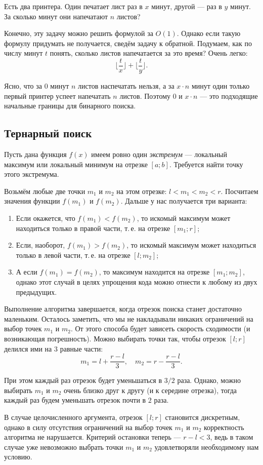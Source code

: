 \begin{problem}
    Есть два принтера. Один печатает лист раз в $x$ минут, другой --- раз в $y$ минут. За сколько минут они напечатают $n$ листов?
\end{problem}

Конечно, эту задачу можно решить формулой за $O(1)$. Однако если такую формулу придумать не получается, сведём задачу к обратной. Подумаем, как по числу минут $t$ понять, сколько листов напечатается за это время? Очень легко:
\[
    \lfloor\frac{t}{x}\rfloor + \lfloor\frac{t}{y}\rfloor.
\]

Ясно, что за $0$ минут $n$ листов наспечатать нельзя, а за $x \cdot n$ минут один только первый принтер успеет напечатать $n$ листов. Поэтому $0$ и $x \cdot n$ --- это подходящие начальные границы для бинарного поиска.

\subsection{Тернарный поиск}

Пусть дана функция $f(x)$ имеем ровно один \textit{экстремум} --- локальный максимум или локальный минимум на отрезке $[a; b]$. Требуется найти точку этого экстремума.

Возьмём любые две точки $m_1$ и $m_2$ на этом отрезке: $l < m_1 < m_2 < r$. Посчитаем значения функции $f(m_1)$ и $f(m_2)$. Дальше у нас получается три варианта:

\begin{enumerate}[nolistsep]
    \item Если окажется, что $f(m_1) < f(m_2)$, то искомый максимум может находиться только в правой части, т.\,е. на отрезке $[m_1; r]$;
    \item Если, наоборот, $f(m_1) > f(m_2)$, то искомый максимум может находиться только в левой части, т.\,е. на отрезке $[l; m_2]$;
    \item А если $f(m_1) = f(m_2)$, то максимум находится на отрезке $[m_1; m_2]$, однако этот случай в целях упрощения кода можно отнести к любому из двух предыдущих.
\end{enumerate}

Выполнение алгоритма завершается, когда отрезок поиска станет достаточно маленьким. Осталось заметить, что мы не накладывали никаких ограничений на выбор точек $m_1$ и $m_2$. От этого способа будет зависеть скорость сходимости (и возникающая погрешность). Можно выбирать точки так, чтобы отрезок $[l; r]$ делился ими на $3$ равные части:
\[
    m_1 = l + \frac{r - l}{3},\quad m_2 = r - \frac{r - l}{3}.
\]

При этом каждый раз отрезок будет уменьшаться в $3 / 2$ раза. Однако, можно выбирать $m_1$ и $m_2$ очень близко друг к другу (и к середине отрезка), тогда каждый раз будем уменьшать отрезок почти в $2$ раза.

В случае целочисленного аргумента, отрезок $[l; r]$ становится дискретным, однако в силу отсутствия ограничений на выбор точек $m_1$ и $m_2$ корректность алгоритма не нарушается. Критерий остановки теперь --- $r - l < 3$, ведь в таком случае уже невозможно выбрать точки $m_1$ и $m_2$ удовлетворяли необходимому нам условию.

